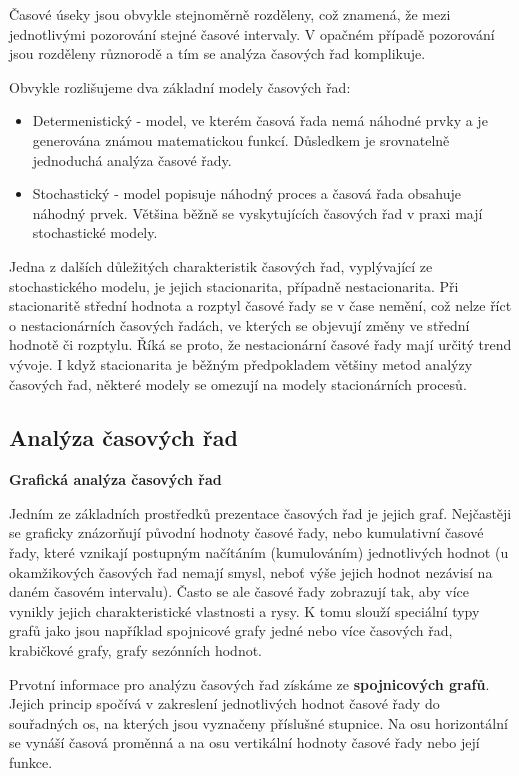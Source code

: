 \documentclass[a4paper,12pt,twoside]{scrreprt}
\begin{document}
Časové úseky jsou obvykle stejnoměrně rozděleny, což znamená, že mezi jednotlivými pozorování stejné časové intervaly. V opačném případě pozorování jsou rozděleny různorodě a tím se analýza časových řad komplikuje. 

Obvykle rozlišujeme dva základní modely časových řad:
\begin{itemize}
\item Determenistický - model, ve kterém časová řada nemá náhodné prvky a je generována známou matematickou funkcí. Důsledkem je srovnatelně jednoduchá analýza časové řady. 
\item Stochastický - model popisuje náhodný proces a časová řada obsahuje náhodný prvek. Většina běžně se vyskytujících časových řad v praxi mají stochastické modely.
\end{itemize}

Jedna z dalších důležitých charakteristik časových řad, vyplývající ze stochastického modelu, je jejich stacionarita, případně nestacionarita. Při stacionaritě střední hodnota a rozptyl časové řady se v čase nemění, což nelze říct o nestacionárních časových řadách, ve kterých se objevují změny ve střední hodnotě či rozptylu. Říká se proto, že nestacionární časové řady mají určitý trend vývoje. I když stacionarita je běžným předpokladem většiny metod analýzy časových řad, některé modely se omezují na modely stacionárních procesů.  

\subsection{Analýza časových řad}
\normalsize \textbf{Grafická analýza časových řad}

Jedním ze základních prostředků prezentace časových řad je jejich graf. Nejčastěji
se graficky znázorňují původní hodnoty časové řady, nebo kumulativní časové řady, které
vznikají postupným načítáním (kumulováním) jednotlivých hodnot (u okamžikových
časových řad nemají smysl, neboť výše jejich hodnot nezávisí na daném časovém
intervalu). Často se ale časové řady zobrazují tak, aby více vynikly jejich charakteristické vlastnosti a rysy. K tomu slouží speciální typy grafů jako jsou například spojnicové grafy jedné nebo více časových řad, krabičkové grafy, grafy sezónních hodnot. 

Prvotní informace pro analýzu časových řad získáme ze \textbf{spojnicových grafů}. Jejich
princip spočívá v zakreslení jednotlivých hodnot časové řady do souřadných os, na kterých
jsou vyznačeny příslušné stupnice. Na osu horizontální se vynáší časová proměnná a na
osu vertikální hodnoty časové řady nebo její funkce.
\end{document}
